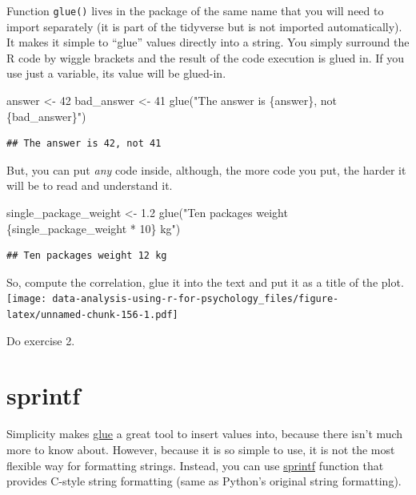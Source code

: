 \documentclass[
]{book}
\newenvironment{Shaded}{\begin{snugshade}}{\end{snugshade}}
\newcommand{\DecValTok}[1]{\textcolor[rgb]{0.00,0.00,0.81}{#1}}
\newcommand{\FloatTok}[1]{\textcolor[rgb]{0.00,0.00,0.81}{#1}}
\newcommand{\FunctionTok}[1]{\textcolor[rgb]{0.00,0.00,0.00}{#1}}
\newcommand{\NormalTok}[1]{#1}
\newcommand{\OtherTok}[1]{\textcolor[rgb]{0.56,0.35,0.01}{#1}}
\newcommand{\StringTok}[1]{\textcolor[rgb]{0.31,0.60,0.02}{#1}}
\begin{document}
Function \texttt{glue()} lives in the package of the same name that you will need to import separately (it is part of the tidyverse but is not imported automatically). It makes it simple to ``glue'' values directly into a string. You simply surround the R code by wiggle brackets and the result of the code execution is glued in. If you use just a variable, its value will be glued-in.

\begin{Shaded}
\begin{Highlighting}[]
\NormalTok{answer }\OtherTok{\textless{}{-}} \DecValTok{42}
\NormalTok{bad\_answer }\OtherTok{\textless{}{-}} \DecValTok{41}
\FunctionTok{glue}\NormalTok{(}\StringTok{"The answer is \{answer\}, not \{bad\_answer\}"}\NormalTok{)}
\end{Highlighting}
\end{Shaded}

\begin{verbatim}
## The answer is 42, not 41
\end{verbatim}

But, you can put \emph{any} code inside, although, the more code you put, the harder it will be to read and understand it.

\begin{Shaded}
\begin{Highlighting}[]
\NormalTok{single\_package\_weight }\OtherTok{\textless{}{-}} \FloatTok{1.2}
\FunctionTok{glue}\NormalTok{(}\StringTok{"Ten packages weight \{single\_package\_weight * 10\} kg"}\NormalTok{)}
\end{Highlighting}
\end{Shaded}

\begin{verbatim}
## Ten packages weight 12 kg
\end{verbatim}

So, compute the correlation, glue it into the text and put it as a title of the plot.
\texttt{[image: data-analysis-using-r-for-psychology\_files/figure-latex/unnamed-chunk-156-1.pdf]}

Do exercise 2.

\hypertarget{sprintf}{%
\section{sprintf}\label{sprintf}}

Simplicity makes \href{https://glue.tidyverse.org/}{glue} a great tool to insert values into, because there isn't much more to know about. However, because it is so simple to use, it is not the most flexible way for formatting strings. Instead, you can use \href{https://stat.ethz.ch/R-manual/R-patched/library/base/html/sprintf.html}{sprintf} function that provides C-style string formatting (same as Python's original string formatting).
\end{document}
